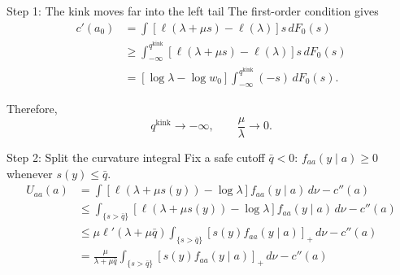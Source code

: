 \documentclass[12pt,aspectratio=169,t]{beamer}
\begin{document}
\begin{frame}{Step 1: The kink moves far into the left tail}
  The first-order condition gives
  \begin{align*}
    c'(a_0)
    &= \int
      [\ell(\lambda+\mu s)-\ell(\lambda)]s\,dF_0(s) \\
    &\geq \int_{-\infty}^{q^{\mathrm{kink}}}
      [\ell(\lambda+\mu s)-\ell(\lambda)]s\,dF_0(s) \\
    &= [\log \lambda - \log w_0]
      \int_{-\infty}^{q^{\mathrm{kink}}}(-s)\,dF_0(s).
  \end{align*}

  Therefore,
  \[
    q^{\mathrm{kink}}\to-\infty,
    \qquad
    \frac{\mu}{\lambda}\to0.
  \]
\end{frame}

\begin{frame}{Step 2: Split the curvature integral}
  Fix a safe cutoff $\bar q<0$: $f_{aa}(y\mid a)\geq0$ whenever $s(y)\leq\bar q$.
  \[
  \begin{aligned}
    U_{aa}(a)
    &= \int
      [\ell(\lambda+\mu s(y))-\log\lambda]
      f_{aa}(y\mid a)\,d\nu-c''(a) \\
    &\leq \int_{\{s>\bar q\}}
      [\ell(\lambda+\mu s(y))-\log\lambda]
      f_{aa}(y\mid a)\,d\nu-c''(a) \\
    &\leq \mu\ell'(\lambda+\mu\bar q)
      \int_{\{s>\bar q\}}[s(y)f_{aa}(y\mid a)]_+\,d\nu-c''(a) \\
    &= \frac{\mu}{\lambda+\mu\bar q}
      \int_{\{s>\bar q\}}[s(y)f_{aa}(y\mid a)]_+\,d\nu-c''(a)
  \end{aligned}
  \]
\end{frame}
\end{document}
